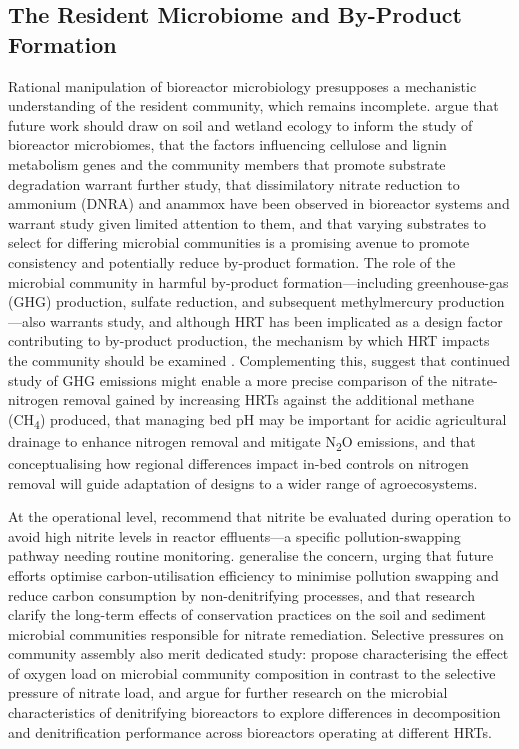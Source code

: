 \subsection{The Resident Microbiome and By-Product Formation}
Rational manipulation of bioreactor microbiology presupposes a mechanistic understanding of the resident community, which remains incomplete. \textcite{Hartfiel2022} argue that future work should draw on soil and wetland ecology to inform the study of bioreactor microbiomes, that the factors influencing cellulose and lignin metabolism genes and the community members that promote substrate degradation warrant further study, that dissimilatory nitrate reduction to ammonium (DNRA) and anammox have been observed in bioreactor systems and warrant study given limited attention to them, and that varying substrates to select for differing microbial communities is a promising avenue to promote consistency and potentially reduce by-product formation. The role of the microbial community in harmful by-product formation---including greenhouse-gas (GHG) production, sulfate reduction, and subsequent methylmercury production---also warrants study, and although HRT has been implicated as a design factor contributing to by-product production, the mechanism by which HRT impacts the community should be examined \parencite{Hartfiel2022}. Complementing this, \textcite{Bock2018} suggest that continued study of GHG emissions might enable a more precise comparison of the nitrate-nitrogen removal gained by increasing HRTs against the additional methane (CH\textsubscript{4}) produced, that managing bed pH may be important for acidic agricultural drainage to enhance nitrogen removal and mitigate N\textsubscript{2}O emissions, and that conceptualising how regional differences impact in-bed controls on nitrogen removal will guide adaptation of designs to a wider range of agroecosystems.

At the operational level, \textcite{Kouanda2021} recommend that nitrite be evaluated during operation to avoid high nitrite levels in reactor effluents---a specific pollution-swapping pathway needing routine monitoring. \textcite{Wang2025b} generalise the concern, urging that future efforts optimise carbon-utilisation efficiency to minimise pollution swapping and reduce carbon consumption by non-denitrifying processes, and that research clarify the long-term effects of conservation practices on the soil and sediment microbial communities responsible for nitrate remediation. Selective pressures on community assembly also merit dedicated study: \textcite{Schaefer2021} propose characterising the effect of oxygen load on microbial community composition in contrast to the selective pressure of nitrate load, and argue for further research on the microbial characteristics of denitrifying bioreactors to explore differences in decomposition and denitrification performance across bioreactors operating at different HRTs.

